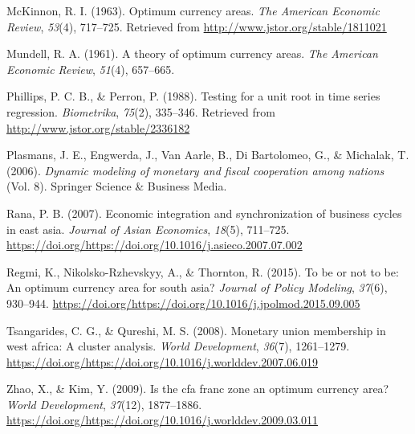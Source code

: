 \documentclass[]{article}
\begin{document}
\leavevmode\hypertarget{ref-McKinnon1963}{}%
McKinnon, R. I. (1963). Optimum currency areas. \emph{The American Economic Review}, \emph{53}(4), 717--725. Retrieved from \url{http://www.jstor.org/stable/1811021}

\leavevmode\hypertarget{ref-mundell1961theory}{}%
Mundell, R. A. (1961). A theory of optimum currency areas. \emph{The American Economic Review}, \emph{51}(4), 657--665.

\leavevmode\hypertarget{ref-10.2307ux2f2336182}{}%
Phillips, P. C. B., \& Perron, P. (1988). Testing for a unit root in time series regression. \emph{Biometrika}, \emph{75}(2), 335--346. Retrieved from \url{http://www.jstor.org/stable/2336182}

\leavevmode\hypertarget{ref-plasmans2006dynamic}{}%
Plasmans, J. E., Engwerda, J., Van Aarle, B., Di Bartolomeo, G., \& Michalak, T. (2006). \emph{Dynamic modeling of monetary and fiscal cooperation among nations} (Vol. 8). Springer Science \& Business Media.

\leavevmode\hypertarget{ref-RANA2007711}{}%
Rana, P. B. (2007). Economic integration and synchronization of business cycles in east asia. \emph{Journal of Asian Economics}, \emph{18}(5), 711--725. \url{https://doi.org/https://doi.org/10.1016/j.asieco.2007.07.002}

\leavevmode\hypertarget{ref-Regmi2015}{}%
Regmi, K., Nikolsko-Rzhevskyy, A., \& Thornton, R. (2015). To be or not to be: An optimum currency area for south asia? \emph{Journal of Policy Modeling}, \emph{37}(6), 930--944. \url{https://doi.org/https://doi.org/10.1016/j.jpolmod.2015.09.005}

\leavevmode\hypertarget{ref-TSANGARIDES20081261}{}%
Tsangarides, C. G., \& Qureshi, M. S. (2008). Monetary union membership in west africa: A cluster analysis. \emph{World Development}, \emph{36}(7), 1261--1279. \url{https://doi.org/https://doi.org/10.1016/j.worlddev.2007.06.019}

\leavevmode\hypertarget{ref-Zhao2009}{}%
Zhao, X., \& Kim, Y. (2009). Is the cfa franc zone an optimum currency area? \emph{World Development}, \emph{37}(12), 1877--1886. \url{https://doi.org/https://doi.org/10.1016/j.worlddev.2009.03.011}
\end{document}
